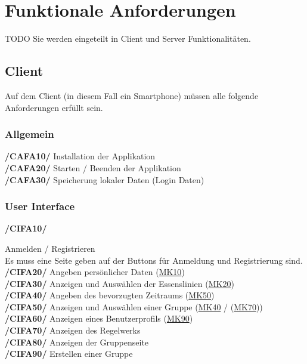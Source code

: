 \documentclass[a4paper]{scrreprt}
\begin{document}
\chapter{Funktionale Anforderungen}
TODO Sie werden eingeteilt in Client und Server Funktionalitäten.

\section{Client}
Auf dem Client (in diesem Fall ein Smartphone) müssen alle folgende Anforderungen erfüllt sein. 

\subsection{Allgemein}

\begin{addmargin}[25pt]{0pt} 
\textbf{/CAFA10/} Installation der Applikation \\
\textbf{/CAFA20/} Starten / Beenden der Applikation\\
\textbf{/CAFA30/} Speicherung lokaler Daten (Login Daten)\\
\end{addmargin}

\subsection{User Interface}

\begin{addmargin}[25pt]{0pt} 
\hypertarget{cifa10}{\textbf{/CIFA10/}} Anmelden / Registrieren \\
Es muss eine Seite geben auf der Buttons für Anmeldung und Registrierung sind.
\hypertarget{cifa20}{\textbf{/CIFA20/}} Angeben persönlicher Daten (\hyperlink{mk10}{MK10})\\
\hypertarget{cifa30}{\textbf{/CIFA30/}} Anzeigen und Auswählen der Essenslinien (\hyperlink{mk20}{MK20})\\
\hypertarget{cifa40}{\textbf{/CIFA40/}} Angeben des bevorzugten Zeitraums (\hyperlink{mk50}{MK50})\\
\hypertarget{cifa50}{\textbf{/CIFA50/}} Anzeigen und Auswählen einer Gruppe (\hyperlink{m40}{MK40} / (\hyperlink{mk70}{MK70}))\\
\hypertarget{cifa60}{\textbf{/CIFA60/}} Anzeigen eines Benutzerprofils (\hyperlink{mk90}{MK90})\\
\hypertarget{cifa70}{\textbf{/CIFA70/}} Anzeigen des Regelwerks\\
\hypertarget{cifa80}{\textbf{/CIFA80/}} Anzeigen der Gruppenseite\\
\hypertarget{cifa90}{\textbf{/CIFA90/}} Erstellen einer Gruppe\\
\end{addmargin}
\end{document}
